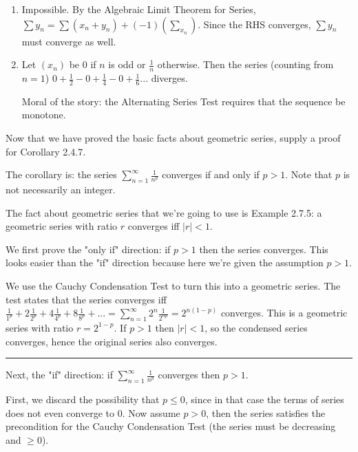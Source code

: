 \documentclass{oxmathproblems}
\begin{document}
\begin{questions}
\begin{solution}
\begin{enumerate}[label=(\alph*)]
    \item Impossible. By the Algebraic Limit Theorem for Series, $\sum y_{n} = \sum (x_{n}+y_{n}) + (-1)(\sum_{x_{n}})$. Since the RHS converges, $\sum y_{n}$ must converge as well.
    
    \item Let $(x_{n})$ be 0 if $n$ is odd or $\frac{1}{n}$ otherwise. Then the series (counting from $n=1$) $0 + \frac{1}{2} - 0 + \frac{1}{4} - 0 + \frac{1}{6}...$ diverges.
    
    Moral of the story: the Alternating Series Test requires that the sequence be monotone.
  \end{enumerate}
\end{solution}

\miquestion Now that we have proved the basic facts about geometric series, supply a proof for Corollary 2.4.7.

\begin{solution}
  The corollary is: the series $\sum_{n=1}^{\infty} \frac{1}{n^p}$ converges if and only if $p > 1$. Note that $p$ is not necessarily an integer.

  The fact about geometric series that we're going to use is Example 2.7.5: a geometric series with ratio $r$ converges iff $|r| < 1$.

  We first prove the "only if" direction: if $p > 1$ then the series converges. This looks easier than the "if" direction because here we're given the
  assumption $p > 1$.

  We use the Cauchy Condensation Test to turn this into a geometric series. The test states that the series converges iff
  $\frac{1}{1^p} + 2\frac{1}{2^p} + 4\frac{1}{4^p} + 8\frac{1}{8^p} + ... = \sum_{n=1}^{\infty}2^{n}\frac{1}{2^{np}} = 2^{n(1-p)}$ converges.
  This is a geometric series with ratio $r = 2^{1-p}$. If $p > 1$ then $|r| < 1$, so the condensed series converges, hence the original series also converges.
  
  \vspace{0.5cm}
  \hrule
  \vspace{0.5cm}

  Next, the "if" direction: if $\sum_{n=1}^{\infty} \frac{1}{n^p}$ converges then $p > 1$.

  First, we discard the possibility that $p \leq 0$, since in that case the terms of series does not even converge to 0. Now assume $p > 0$,
  then the series satisfies the precondition for the Cauchy Condensation Test (the series must be decreasing and $\geq 0$).
  

\end{solution}
\end{questions}
\end{document}
